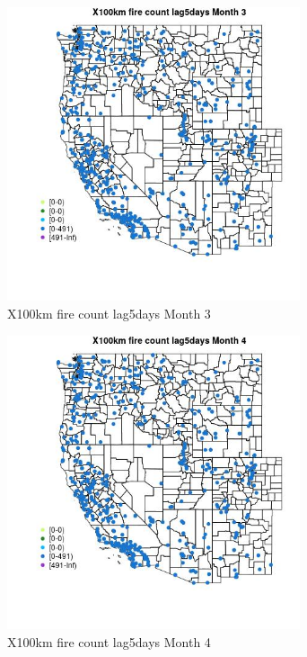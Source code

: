 \begin{figure} 
\centering  
\includegraphics[width=0.77\textwidth]{Code_Outputs/Report_ML_input_PM25_Step4_part_e_de_duplicated_aves_compiled_2019-05-14wNAs_MapObsMo3X100km_fire_count_lag5days.jpg} 
\caption{\label{fig:Report_ML_input_PM25_Step4_part_e_de_duplicated_aves_compiled_2019-05-14wNAsMapObsMo3X100km_fire_count_lag5days}X100km fire count lag5days Month 3} 
\end{figure} 
 

\begin{figure} 
\centering  
\includegraphics[width=0.77\textwidth]{Code_Outputs/Report_ML_input_PM25_Step4_part_e_de_duplicated_aves_compiled_2019-05-14wNAs_MapObsMo4X100km_fire_count_lag5days.jpg} 
\caption{\label{fig:Report_ML_input_PM25_Step4_part_e_de_duplicated_aves_compiled_2019-05-14wNAsMapObsMo4X100km_fire_count_lag5days}X100km fire count lag5days Month 4} 
\end{figure} 
 

